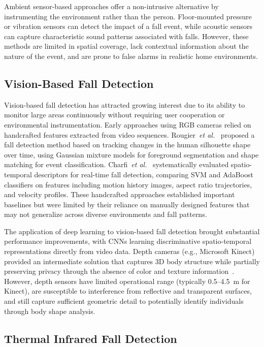 Ambient sensor-based approaches offer a non-intrusive alternative by instrumenting the environment rather than the person. Floor-mounted pressure or vibration sensors can detect the impact of a fall event, while acoustic sensors can capture characteristic sound patterns associated with falls. However, these methods are limited in spatial coverage, lack contextual information about the nature of the event, and are prone to false alarms in realistic home environments.

\subsection*{Vision-Based Fall Detection}

Vision-based fall detection has attracted growing interest due to its ability to monitor large areas continuously without requiring user cooperation or environmental instrumentation. Early approaches using RGB cameras relied on handcrafted features extracted from video sequences. Rougier~\emph{et al.}~\cite{rougier2011robust} proposed a fall detection method based on tracking changes in the human silhouette shape over time, using Gaussian mixture models for foreground segmentation and shape matching for event classification. Charfi~\emph{et al.}~\cite{charfi2013optimized} systematically evaluated spatio-temporal descriptors for real-time fall detection, comparing SVM and AdaBoost classifiers on features including motion history images, aspect ratio trajectories, and velocity profiles. These handcrafted approaches established important baselines but were limited by their reliance on manually designed features that may not generalize across diverse environments and fall patterns.

The application of deep learning to vision-based fall detection brought substantial performance improvements, with CNNs learning discriminative spatio-temporal representations directly from video data. Depth cameras (e.g., Microsoft Kinect) provided an intermediate solution that captures 3D body structure while partially preserving privacy through the absence of color and texture information~\cite{mastorakis2014fall}. However, depth sensors have limited operational range (typically 0.5--4.5~m for Kinect), are susceptible to interference from reflective and transparent surfaces, and still capture sufficient geometric detail to potentially identify individuals through body shape analysis.

\subsection*{Thermal Infrared Fall Detection}

